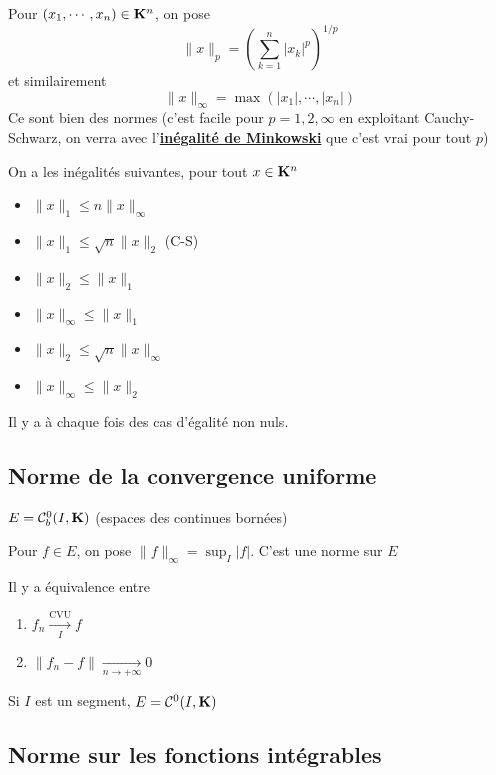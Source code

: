 Pour $(x_1, \cdots , x_n) \in  \mathbf K^n$, on pose \[
    \|x\|_p = \left( \sum_{k=1}^{n} |x_k|^{p} \right) ^{1 / p}
\]
et similairement \[
    \|x\|_\infty = \max(|x_1|, \cdots , |x_n|)
\]
Ce sont bien des normes (c'est facile pour $p = 1, 2, \infty$ en exploitant Cauchy-Schwarz, on verra avec l'\textbf{\hyperref[sec:minkowski-holder]{inégalité de Minkowski}}  que c'est vrai pour tout $p$)

On a les inégalités suivantes, pour tout $x \in  \mathbf K^n$ \begin{itemize}
    \item $\|x\|_1 \leq  n \|x\|_\infty$
    \item $\|x\|_1 \leq  \sqrt{n} \|x\|_2$ (C-S)
    \item $\|x\|_2 \leq  \|x\|_1$
    \item $\|x\|_\infty \leq  \|x\|_1$ 
    \item $\|x\|_2 \leq  \sqrt{ n } \|x\|_\infty$
    \item $\|x\|_\infty \leq  \|x\|_2$
\end{itemize}
Il y a à chaque fois des cas d'égalité non nuls.

\subsection{Norme de la convergence uniforme}

\begin{prop}
    \Hyp $E = \mathcal  C^0_b(I, \mathbf K)$ (espaces des continues bornées)
    \begin{concenum}
    \item Pour $f \in  E$, on pose $\|f\|_\infty = \sup_{I}|f|$. C'est une norme sur $E$
    \item Il y a équivalence entre  \begin{enumerate}
        \item $f_n \xrightarrow[I]{\text{CVU}}f$
        \item  $\|f_n-f\|\xrightarrow[n\to +\infty]{}0$
    \end{enumerate}
    \end{concenum}
\end{prop}

\begin{rem}
    Si $I$ est un segment,  $E=\mathcal  C^0(I, \mathbf K)$
\end{rem}

\subsection{Norme sur les fonctions intégrables}

